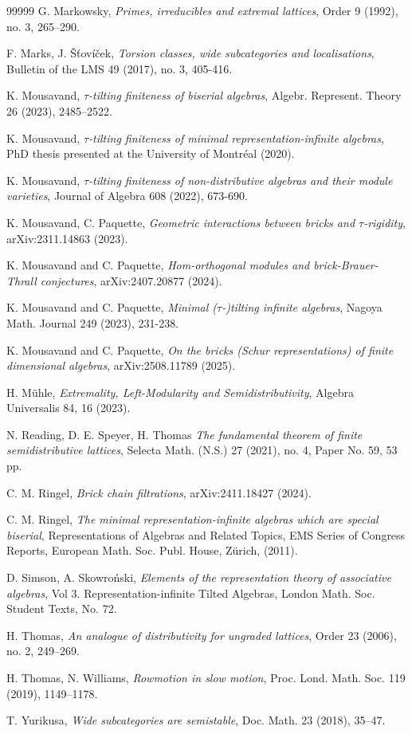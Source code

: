 \documentclass{amsart}
\theoremstyle{thmstyle}
\theoremstyle{exstyle}
\theoremstyle{defstyle}
\theoremstyle{remstyle}
\theoremstyle{remstyle}
\begin{document}
\begin{thebibliography}{99999}
     G. Markowsky,
\emph{Primes, irreducibles and extremal lattices}, Order 9 (1992), no. 3, 265–290.

    F. Marks, J. Šťovíček, 
\emph{Torsion classes, wide subcategories and localisations}, Bulletin of the LMS 49 (2017), no. 3, 405-416.

     K. Mousavand,
\emph{$\tau$-tilting finiteness of biserial algebras}, Algebr. Represent. Theory 26 (2023), 2485–2522.

     K. Mousavand,
\emph{$\tau$-tilting finiteness of minimal representation-infinite algebras}, PhD thesis presented at the University of Montréal (2020).

     K. Mousavand,
\emph{$\tau$-tilting finiteness of non-distributive algebras and their module varieties}, Journal of Algebra 608 (2022), 673-690.
    
     K. Mousavand, C. Paquette,
\emph{Geometric interactions between bricks and $\tau$-rigidity}, arXiv:2311.14863 (2023).

    K. Mousavand and C. Paquette,
\emph{Hom-orthogonal modules and brick-Brauer-Thrall conjectures}, arXiv:2407.20877 (2024).

    K. Mousavand and C. Paquette,
\emph{Minimal ($\tau$-)tilting infinite algebras}, Nagoya Math. Journal 249 (2023), 231-238.

    K. Mousavand and C. Paquette,
\emph{On the bricks (Schur representations) of finite dimensional algebras}, 	arXiv:2508.11789 (2025).

    H. Mühle,
\emph{Extremality, Left-Modularity and Semidistributivity}, Algebra Universalis 84, 16 (2023).

     N. Reading, D. E. Speyer, H. Thomas
\emph{The fundamental theorem of finite semidistributive lattices}, Selecta Math. (N.S.) 27 (2021), no. 4, Paper No. 59, 53 pp.

     C. M. Ringel, 
\emph{Brick chain filtrations}, arXiv:2411.18427 (2024).

     C. M. Ringel, 
\emph{The minimal representation-infinite algebras which are special biserial}, Representations of Algebras and Related Topics, EMS Series of Congress Reports, European Math. Soc. Publ. House, Zürich, (2011).

     D. Simson, A. Skowroński,
\emph{Elements of the representation theory of associative algebras}, Vol 3. Representation-infinite Tilted Algebras, London Math. Soc. Student Texts, No. 72.

     H. Thomas, 
\emph{An analogue of distributivity for ungraded lattices}, Order 23 (2006), no. 2, 249–269.

     H. Thomas, N. Williams,
\emph{Rowmotion in slow motion}, Proc. Lond. Math. Soc. 119 (2019), 1149–1178.

     T. Yurikusa, \emph{Wide subcategories are semistable}, Doc. Math. 23 (2018), 35--47.

\end{thebibliography}
\end{document}
